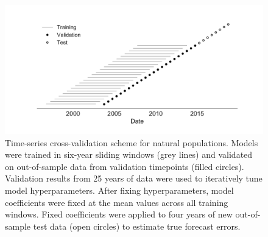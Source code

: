 \begin{figure}[H]
  \begin{center}
  \includegraphics[width=\textwidth]{figures/cross-validation-for-natural-populations.pdf}
  \caption{
  Time-series cross-validation scheme for natural populations.
  Models were trained in six-year sliding windows (grey lines) and validated on out-of-sample data from validation timepoints (filled circles).
  Validation results from 25 years of data were used to iteratively tune model hyperparameters.
  After fixing hyperparameters, model coefficients were fixed at the mean values across all training windows.
  Fixed coefficients were applied to four years of new out-of-sample test data (open circles) to estimate true forecast errors.
  }
  \label{sup_fig:cross_validation_for_natural_populations}
  \end{center}
\end{figure}

